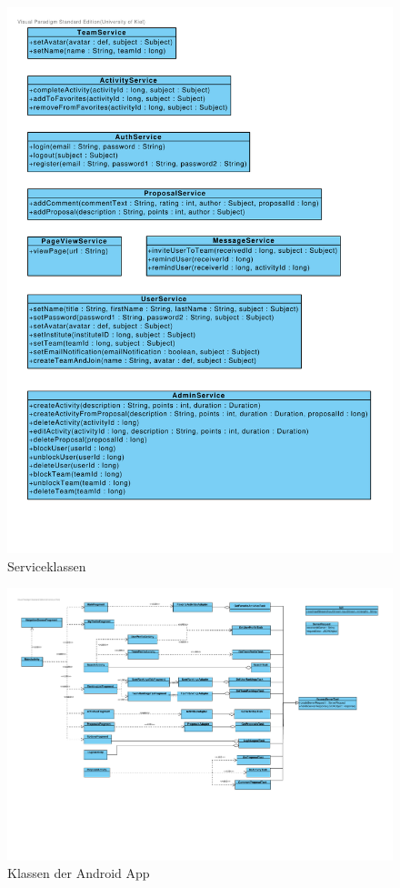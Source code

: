 \begin{figure}[H]
  \centering
  \includegraphics[width=\textwidth, trim=1cm 1cm 1cm 1cm, clip]{gfx/service_classes}
  \caption{Serviceklassen}
\end{figure}

\begin{figure}[H]
	\centering
	\includegraphics[width=18cm, trim=1cm 7cm 1cm 1cm, clip, angle=90]{gfx/androidapp_classes}
	\caption{Klassen der Android App}
\end{figure}